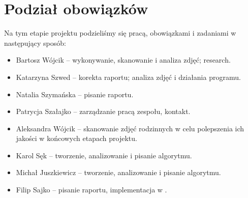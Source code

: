 \documentclass[]{mwart}
\begin{document}
\section{Podział obowiązków}
Na tym etapie projektu podzieliśmy się pracą, obowiązkami i zadaniami w następujący sposób:
\begin{itemize}
    \item Bartosz Wójcik -- wykonywanie, skanowanie i analiza zdjęć; research.
    \item Katarzyna Szwed -- korekta raportu; analiza zdjęć i działania programu.
    \item Natalia Szymańska -- pisanie raportu.
    \item Patrycja Szałajko -- zarządzanie pracą zespołu, kontakt.
    \item Aleksandra Wójcik -- skanowanie zdjęć rodzinnych w celu polepszenia ich jakości w końcowych etapach projektu.
    \item Karol Sęk -- tworzenie, analizowanie i pisanie algorytmu.
    \item Michał Juszkiewicz -- tworzenie, analizowanie i pisanie algorytmu.
    \item Filip Sajko -- pisanie raportu, implementacja w \LaTeXe{}.
\end{itemize}
\end{document}
